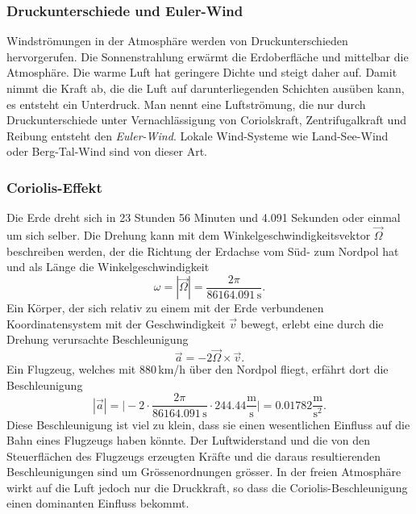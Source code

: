 \subsubsection{Druckunterschiede und Euler-Wind}
Windströmungen in der Atmosphäre werden von Druckunterschieden
hervorgerufen.
Die Sonnenstrahlung erwärmt die Erdoberfläche und mittelbar die
Atmosphäre.
Die warme Luft hat geringere Dichte und steigt daher auf.
Damit nimmt die Kraft ab, die die Luft auf darunterliegenden
Schichten ausüben kann, es entsteht ein Unterdruck.
Man nennt eine Luftströmung, die nur durch Druckunterschiede
unter Vernachlässigung von Coriolskraft, Zentrifugalkraft und
Reibung entsteht den {\em Euler-Wind}.
Lokale Wind-Systeme wie Land-See-Wind oder Berg-Tal-Wind sind von
dieser Art.

\subsubsection{Coriolis-Effekt}
%
%
Die Erde dreht sich in 23 Stunden 56 Minuten und 4.091 Sekunden
oder 
einmal um sich selber.
Die Drehung kann mit dem Winkelgeschwindigkeitsvektor
$\vec{\Omega}$
beschreiben werden, der die Richtung der Erdachse vom Süd- zum Nordpol
hat und als Länge die Winkelgeschwindigkeit
\[
\omega
=
|\vec{\Omega}|
=
\frac{2\pi}{86164.091\,\text{s}}.
\]
Ein Körper, der sich relativ zu einem mit der Erde verbundenen
Koordinatensystem mit der Geschwindigkeit $\vec{v}$ bewegt,
erlebt eine durch die Drehung verursachte Beschleunigung
\[
\vec{a} = -2\vec{\Omega}\times\vec{v}.
\]
Ein Flugzeug, welches mit 880\,km/h über den Nordpol fliegt,
erfährt dort die Beschleunigung 
\[
|\vec{a}|
=
\biggl|
-2
\cdot
\frac{2\pi}{86164.091\,\text{s}}
\cdot
244.44\frac{\text{m}}{\text{s}}
\biggr|
=
0.01782\frac{\text{m}}{\text{s}^2}.
\]
Diese Beschleunigung ist viel zu klein, dass sie einen wesentlichen
Einfluss auf die Bahn eines Flugzeugs haben könnte.
Der Luftwiderstand und die von den Steuerflächen des Flugzeugs erzeugten
Kräfte und die daraus resultierenden Beschleunigungen sind
um Grössenordnungen grösser.
In der freien Atmosphäre wirkt auf die Luft jedoch nur die Druckkraft,
so dass die Coriolis-Beschleunigung einen dominanten Einfluss bekommt.

